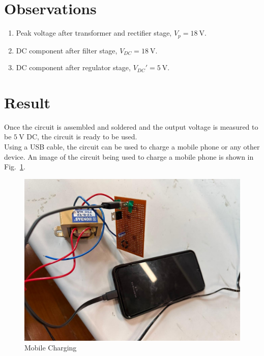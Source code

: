 \documentclass[journal,12pt,twocolumn]{IEEEtran}
\begin{document}
\section{Observations}
\begin{enumerate}
    \item Peak voltage after transformer and rectifier stage, 
        \( V_p = \SI[parse-numbers=false]{18}{\V} \).
    \item DC component after filter stage, 
        \( V_{DC} = \SI[parse-numbers=false]{18}{\V} \).
    \item DC component after regulator stage, $V_{DC}' = \SI{5}{\V}$.
\end{enumerate}

\section{Result}
Once the circuit is assembled and soldered and the output voltage is measured
to be \( \SI{5}{\volt} \) DC, the circuit is ready to be used. \\
Using a USB cable, the circuit can be used to charge a mobile phone or any other device.
An image of the circuit being used to charge a mobile phone is shown in Fig.~\ref{fig:phone}.

\begin{figure}[!htb]
    \includegraphics[keepaspectratio=true,width=\columnwidth]{figs/phone}
    \caption{Mobile Charging}
    \label{fig:phone}
\end{figure}
\end{document}
